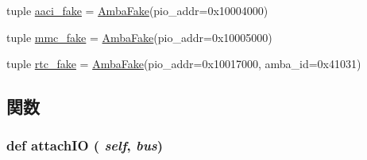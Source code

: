\begin{DoxyCompactItemize}
\item 
tuple \hyperlink{classRealView_1_1RealViewEB_a40e0278b62fc0e814579ee52118d2e2a}{aaci\_\-fake} = \hyperlink{classRealView_1_1AmbaFake}{AmbaFake}(pio\_\-addr=0x10004000)
\item 
tuple \hyperlink{classRealView_1_1RealViewEB_aea1f4d5125bc4930882b7415e32696dc}{mmc\_\-fake} = \hyperlink{classRealView_1_1AmbaFake}{AmbaFake}(pio\_\-addr=0x10005000)
\item 
tuple \hyperlink{classRealView_1_1RealViewEB_a3b65f0dff3a9ed3be7ee1f74df46a92f}{rtc\_\-fake} = \hyperlink{classRealView_1_1AmbaFake}{AmbaFake}(pio\_\-addr=0x10017000, amba\_\-id=0x41031)
\end{DoxyCompactItemize}


\subsection{関数}
\hypertarget{classRealView_1_1RealViewEB_ac750675f6d6de3ad52f8c5b03ee45a65}{
\subsubsection[{attachIO}]{\setlength{\rightskip}{0pt plus 5cm}def attachIO ( {\em self}, \/   {\em bus})}}
\label{classRealView_1_1RealViewEB_ac750675f6d6de3ad52f8c5b03ee45a65}




